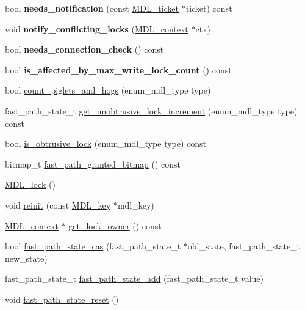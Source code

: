 \begin{DoxyCompactItemize}
\mbox{\label{classMDL__lock_a1eddfbd81b16d050a7a7d5a31e4242c6}} 
bool {\bfseries needs\+\_\+notification} (const \mbox{\hyperlink{classMDL__ticket}{M\+D\+L\+\_\+ticket}} $\ast$ticket) const
\item 
\mbox{\label{classMDL__lock_a20b6aaea388daf444e3f2c0d31362b15}} 
void {\bfseries notify\+\_\+conflicting\+\_\+locks} (\mbox{\hyperlink{classMDL__context}{M\+D\+L\+\_\+context}} $\ast$ctx)
\item 
\mbox{\label{classMDL__lock_a5bb8fcb19fe7323eb0044ebb78258c75}} 
bool {\bfseries needs\+\_\+connection\+\_\+check} () const
\item 
\mbox{\label{classMDL__lock_a7af5a6e02d50241f9c6417a01572c4ee}} 
bool {\bfseries is\+\_\+affected\+\_\+by\+\_\+max\+\_\+write\+\_\+lock\+\_\+count} () const
\item 
bool \mbox{\hyperlink{classMDL__lock_a39f1b569ef4a8405826d9bc9720205c0}{count\+\_\+piglets\+\_\+and\+\_\+hogs}} (enum\+\_\+mdl\+\_\+type type)
\item 
fast\+\_\+path\+\_\+state\+\_\+t \mbox{\hyperlink{classMDL__lock_aa5f2a62914d438aa6e97a50fc8050c74}{get\+\_\+unobtrusive\+\_\+lock\+\_\+increment}} (enum\+\_\+mdl\+\_\+type type) const
\item 
bool \mbox{\hyperlink{classMDL__lock_a0438fd341e3bedb63452c44ec95a00ff}{is\+\_\+obtrusive\+\_\+lock}} (enum\+\_\+mdl\+\_\+type type) const
\item 
bitmap\+\_\+t \mbox{\hyperlink{classMDL__lock_a44d77e8b91c3f09ac46adb6dccf7a460}{fast\+\_\+path\+\_\+granted\+\_\+bitmap}} () const
\item 
\mbox{\hyperlink{classMDL__lock_aeb9c4ffed74256bb57fca7619d141bf4}{M\+D\+L\+\_\+lock}} ()
\item 
void \mbox{\hyperlink{classMDL__lock_aaa2f6326006b7c7ba179075c82707d59}{reinit}} (const \mbox{\hyperlink{structMDL__key}{M\+D\+L\+\_\+key}} $\ast$mdl\+\_\+key)
\item 
\mbox{\hyperlink{classMDL__context}{M\+D\+L\+\_\+context}} $\ast$ \mbox{\hyperlink{classMDL__lock_ada93a4c2a1f01792f9c3e352dbf900fc}{get\+\_\+lock\+\_\+owner}} () const
\item 
bool \mbox{\hyperlink{classMDL__lock_a716b40d532b18db6c2527d1a46908c29}{fast\+\_\+path\+\_\+state\+\_\+cas}} (fast\+\_\+path\+\_\+state\+\_\+t $\ast$old\+\_\+state, fast\+\_\+path\+\_\+state\+\_\+t new\+\_\+state)
\item 
fast\+\_\+path\+\_\+state\+\_\+t \mbox{\hyperlink{classMDL__lock_afc838e4678e75b56554e1ca142439dce}{fast\+\_\+path\+\_\+state\+\_\+add}} (fast\+\_\+path\+\_\+state\+\_\+t value)
\item 
void \mbox{\hyperlink{classMDL__lock_aeedaf89f7d4526d4d59c170fed9ffe2a}{fast\+\_\+path\+\_\+state\+\_\+reset}} ()
\end{DoxyCompactItemize}
